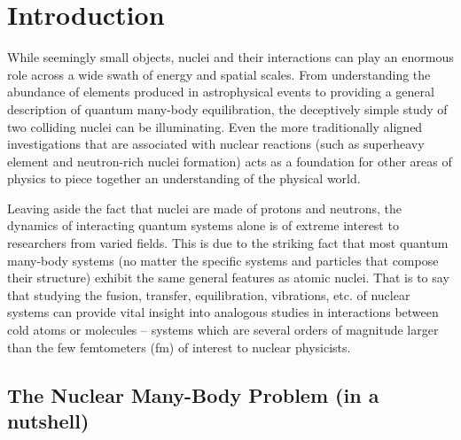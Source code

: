 
\chapter{Introduction}\label{chapters:Introduction}
\vspace{-7mm}

While seemingly small objects, nuclei and their interactions can play an enormous role across a wide swath of energy and spatial scales.
From understanding the abundance of elements produced in astrophysical events to providing a general description of quantum many-body equilibration, the deceptively simple study of two colliding nuclei can be illuminating.
Even the more traditionally aligned investigations that are associated with nuclear reactions (such as superheavy element and neutron-rich nuclei formation) acts as a foundation for other areas of physics to piece together an understanding of the physical world.

Leaving aside the fact that nuclei are made of protons and neutrons, the dynamics of interacting quantum systems alone is of extreme interest to researchers from varied fields.
This is due to the striking fact that most quantum many-body systems (no matter the specific systems and particles that compose their structure) exhibit the same general features as atomic nuclei.
That is to say that studying the fusion, transfer, equilibration, vibrations, etc. of nuclear systems can provide vital insight into analogous studies in interactions between cold atoms or molecules -- systems which are several orders of magnitude larger than the few femtometers (fm) of interest to nuclear physicists.

\section{The Nuclear Many-Body Problem (in a nutshell)}

